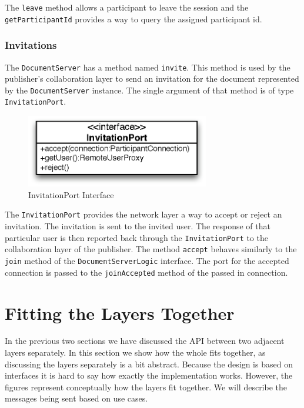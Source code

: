 The \texttt{leave} method allows a participant to leave the session and
the \texttt{getParticipantId} provides a way to query the assigned
participant id.


\subsubsection{Invitations}
\label{archoverview.net.invite}
The \texttt{DocumentServer} has a method named \texttt{invite}. This method
is used by the publisher's collaboration layer to send an invitation for the
document represented by the \texttt{DocumentServer} instance. The single
argument of that method is of type \texttt{InvitationPort}.

\begin{figure}[H]
 \centering
 \includegraphics[width=8.00cm,height=3.18cm]{../images/finalreport/architecture_invitationport_uml.eps}
 \caption{InvitationPort Interface}
\end{figure}

The \texttt{InvitationPort} provides the network layer a way to accept or
reject an invitation. The invitation is sent to the invited user. The response
of that particular user is then reported back through the 
\texttt{InvitationPort} to the collaboration layer of the publisher. The
method \texttt{accept} behaves similarly to the \texttt{join} method of
the \texttt{DocumentServerLogic} interface. The port for the accepted 
connection is passed to the \texttt{joinAccepted} method of the passed
in connection.



\section{Fitting the Layers Together}
In the previous two sections we have discussed the API between two adjacent
layers separately. In this section we show how the whole fits together,
as discussing the layers separately is a bit abstract.
Because the design is based on 
interfaces it is hard to say how exactly the implementation works. However,
the figures represent conceptually how the layers fit together. We will
describe the messages being sent based on use cases.


